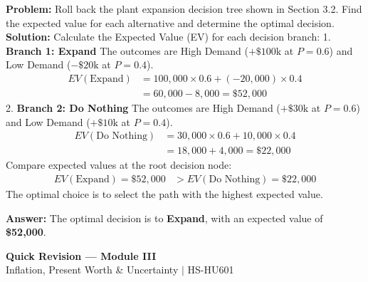 \documentclass[12pt,a4paper]{article}
\begin{document}
\begin{tcolorbox}[examplebox, title={Example 3: Decision Tree Rollback}]
\textbf{Problem:} Roll back the plant expansion decision tree shown in Section 3.2. Find the expected value for each alternative and determine the optimal decision.\\[4pt]
\textbf{Solution:}
Calculate the Expected Value (EV) for each decision branch:
1.  \textbf{Branch 1: Expand}
    The outcomes are High Demand ($+\$100\text{k}$ at $P=0.6$) and Low Demand ($-\$20\text{k}$ at $P=0.4$).
    \begin{align*}
      EV(\text{Expand}) &= 100,000 \times 0.6 + (-20,000) \times 0.4 \\
                        &= 60,000 - 8,000 = \$52,000
    \end{align*}
2.  \textbf{Branch 2: Do Nothing}
    The outcomes are High Demand ($+\$30\text{k}$ at $P=0.6$) and Low Demand ($+\$10\text{k}$ at $P=0.4$).
    \begin{align*}
      EV(\text{Do Nothing}) &= 30,000 \times 0.6 + 10,000 \times 0.4 \\
                            &= 18,000 + 4,000 = \$22,000
    \end{align*}
Compare expected values at the root decision node:
\begin{align*}
  EV(\text{Expand}) = \$52,000 &> EV(\text{Do Nothing}) = \$22,000
\end{align*}
The optimal choice is to select the path with the highest expected value.
\par\vspace{3pt}
\textbf{Answer:} The optimal decision is to \textbf{Expand}, with an expected value of \textbf{\$52,000}.
\end{tcolorbox}

\newpage
\begin{center}
  {\large\bfseries\color{myred} Quick Revision --- Module III}\\[3pt]
  {\small\color{mydark} Inflation, Present Worth \& Uncertainty $|$ HS-HU601}
\end{center}
\noindent{\color{myred}\rule{\linewidth}{1.2pt}}
\vspace{4pt}
\end{document}
